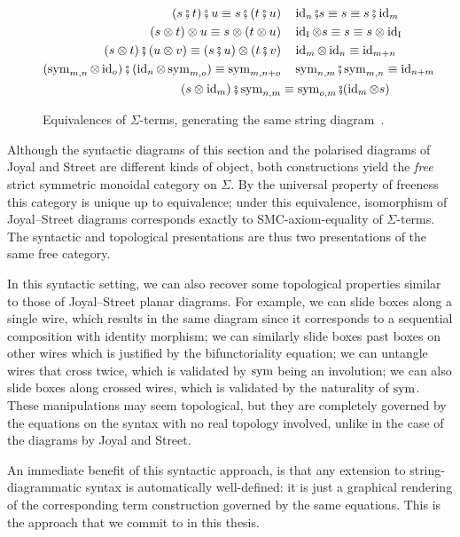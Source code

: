 \begin{figure}
\begin{align*}
  (s \fatsemi t) \fatsemi u \equiv s \fatsemi (t \fatsemi u) &\quad \operatorname{id}_n \fatsemi s \equiv s \equiv s \fatsemi \operatorname{id}_m\\
  (s \otimes t) \otimes u \equiv s \otimes (t \otimes u) &\quad \operatorname{id}_{\operatorname{I}} \otimes s \equiv s \equiv s \otimes \operatorname{id}_{\operatorname{I}}\\
  (s \otimes t) \fatsemi (u \otimes v) \equiv (s \fatsemi u) \otimes (t \fatsemi v) &\quad \operatorname{id}_m \otimes \operatorname{id}_n \equiv \operatorname{id}_{m+n}\\
  (\operatorname{sym}_{m,n} \otimes \operatorname{id}_o) \fatsemi (\operatorname{id}_n \otimes \operatorname{sym}_{m,o}) \equiv \operatorname{sym}_{m,n+o} &\quad \operatorname{sym}_{n,m} \fatsemi \operatorname{sym}_{m,n} \equiv \operatorname{id}_{n+m}\\
  (s \otimes \operatorname{id}_m) \fatsemi \operatorname{sym}_{n,m} &\equiv \operatorname{sym}_{o,m} \fatsemi (\operatorname{id}_m \otimes s)
\end{align*}
\caption{Equivalences of $\Sigma$-terms, generating the same string diagram~\cite{bonchi_string_2022-1}.}
\label{fig:string-diagram-axioms}
\end{figure}

\begin{remark}
Although the syntactic diagrams of this section and the polarised diagrams of Joyal and Street are different kinds of object, both constructions yield the \emph{free} strict symmetric monoidal category on $\Sigma$.
By the universal property of freeness this category is unique up to equivalence; under this equivalence, isomorphism of Joyal--Street diagrams corresponds exactly to SMC-axiom-equality of $\Sigma$-terms.
The syntactic and topological presentations are thus two presentations of the same free category.

In this syntactic setting, we can also recover some topological properties similar to those of Joyal--Street planar diagrams.
For example, we can slide boxes along a single wire, which results in the same diagram since it corresponds to a sequential composition with identity morphism; we can similarly slide boxes past boxes on other wires which is justified by the bifunctoriality equation; we can untangle wires that cross twice, which is validated by $\operatorname{sym}$ being an involution; we can also slide boxes along crossed wires, which is validated by the naturality of $\operatorname{sym}$.
These manipulations may seem topological, but they are completely governed by the equations on the syntax with no real topology involved, unlike in the case of the diagrams by Joyal and Street.

An immediate benefit of this syntactic approach, is that any extension to string-diagrammatic syntax is automatically well-defined: it is just a graphical rendering of the corresponding term construction governed by the same equations.
This is the approach that we commit to in this thesis.
\end{remark}

